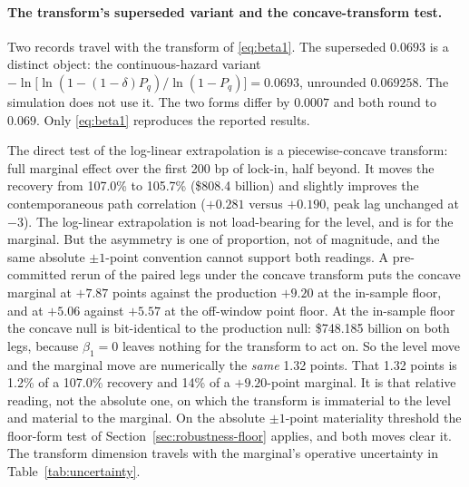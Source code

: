 \documentclass[12pt]{article}
\begin{document}
\paragraph{The transform's superseded variant and the concave-transform test.}
Two records travel with the transform of \eqref{eq:beta1}. The superseded $0.0693$ is a distinct object: the continuous-hazard variant $-\ln\!\big[\ln(1-(1-\delta)P_q)/\ln(1-P_q)\big] = 0.0693$, unrounded $0.069258$. The simulation does not use it. The two forms differ by $0.0007$ and both round to $0.069$. Only \eqref{eq:beta1} reproduces the reported results.

The direct test of the log-linear extrapolation is a piecewise-concave transform: full marginal effect over the first 200 bp of lock-in, half beyond. It moves the recovery from 107.0\% to 105.7\% (\$808.4 billion) and slightly improves the contemporaneous path correlation ($+0.281$ versus $+0.190$, peak lag unchanged at $-3$). The log-linear extrapolation is not load-bearing for the level, and is for the marginal. But the asymmetry is one of proportion, not of magnitude, and the same absolute $\pm 1$-point convention cannot support both readings. A pre-committed rerun of the paired legs under the concave transform puts the concave marginal at $+7.87$ points against the production $+9.20$ at the in-sample floor, and at $+5.06$ against $+5.57$ at the off-window point floor. At the in-sample floor the concave null is bit-identical to the production null: \$748.185 billion on both legs, because $\beta_1 = 0$ leaves nothing for the transform to act on. So the level move and the marginal move are numerically the \emph{same} 1.32 points. That 1.32 points is 1.2\% of a 107.0\% recovery and 14\% of a $+9.20$-point marginal. It is that relative reading, not the absolute one, on which the transform is immaterial to the level and material to the marginal. On the absolute $\pm 1$-point materiality threshold the floor-form test of Section~\ref{sec:robustness-floor} applies, and both moves clear it. The transform dimension travels with the marginal's operative uncertainty in Table~\ref{tab:uncertainty}.
\end{document}
